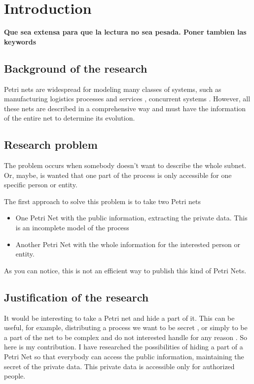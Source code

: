 
\chapter{Introduction} %

\label{Chapter1} %


\textbf{Que sea extensa para que la lectura no sea pesada. Poner tambien
las keywords}

\section{Background of the research}
Petri nets are widespread for modeling many
classes of systems, such as manufacturing logistics processes and services
\citep{SM-Jimenez2004143,SM-Guasch2002}, concurrent systems \citep{EPN-Jensen2009}. However, all these nets are described in a comprehensive way and must have the information of the entire net to determine
its evolution.


\section{Research problem}
The problem occurs when somebody doesn't want to describe the whole subnet.
Or, maybe, is wanted that one part of the process is only accessible for one
specific person or entity.


The first approach to solve this problem is to
take two Petri nets


\begin{itemize}
\item
One Petri Net with the public information, extracting the private data. This
is an incomplete model of the process
\item
Another Petri Net with the whole information
for the interested person or entity.

\end{itemize}  

As you can notice, this is not an efficient way to publish this kind of Petri
Nets.



\section{Justification of the research}
It would be interesting to take a Petri net and
hide a part of it. This can be useful, for example,
distributing a process we want to be secret \citep{HID-Inigo2011MT},
or simply to be a part of the net to be complex and do not
interested handle for any reason \citep{HID-Inigo2011MT}.
So here is my contribution. I have researched the possibilities of hiding
a part of a Petri Net so that everybody can access the public information,
maintaining the secret of the private data. This private data is accessible only
for authorized people.

